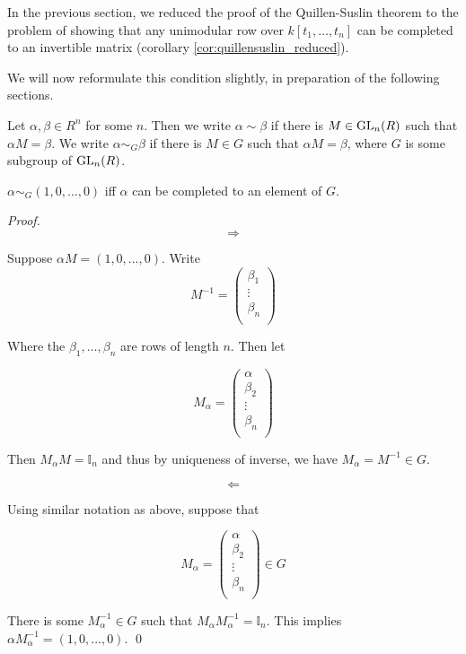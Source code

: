 In the previous section, we reduced the proof of the Quillen-Suslin theorem to the
problem of showing that any unimodular row over $k[t_1, \dots, t_n]$ can be completed to an invertible matrix (corollary \ref{cor:quillensuslin_reduced}).

We will now reformulate this condition slightly, in preparation of the following sections.

\begin{notation}
  Let $\alpha,\beta \in R^n$ for some $n$.
  Then we write $\alpha \sim \beta$ if there is $M \in \text{GL}_n(R)$ such that $\alpha M = \beta$.
  We write $\alpha \sim_G \beta$ if there is $M \in G$ such that $\alpha M = \beta$, where $G$ is some
  subgroup of $\text{GL}_n(R)$.
\end{notation}

\begin{proposition}
$\alpha \sim_G (1,0,\dots,0)$ iff $\alpha$ can be completed to an element of $G$.
\end{proposition}

\begin{proof}

\[
  \Rightarrow
\]

Suppose $\alpha M = (1,0,\dots,0)$.
Write
\[
  M^{-1}
  =
  \left(
  \begin{array}{c}
    \beta_1 \\
    \vdots     \\
    \beta_n \\
  \end{array}
  \right)
\]

Where the $\beta_1, \dots, \beta_n$ are rows of length $n$.
Then let

\[
  M_\alpha
  =
  \left(
  \begin{array}{c}
    \alpha  \\
    \beta_2 \\
    \vdots  \\
    \beta_n \\
  \end{array}
  \right)
\]

Then $M_\alpha M = \mathbb{I}_n$ and thus by uniqueness of inverse, we have $M_\alpha = M^{-1} \in G$.

\[
  \Leftarrow
\]

Using similar notation as above, suppose that

\[
  M_\alpha
  =
  \left(
  \begin{array}{c}
    \alpha  \\
    \beta_2 \\
    \vdots  \\
    \beta_n \\
  \end{array}
  \right)
  \in
  G
\]

There is some $M_\alpha^{-1} \in G$ such that $M_\alpha M_\alpha^{-1} = \mathbb{I}_n$.
This implies $\alpha M_\alpha^{-1} = (1,0,\dots,0)$.
  \qed
\end{proof}


